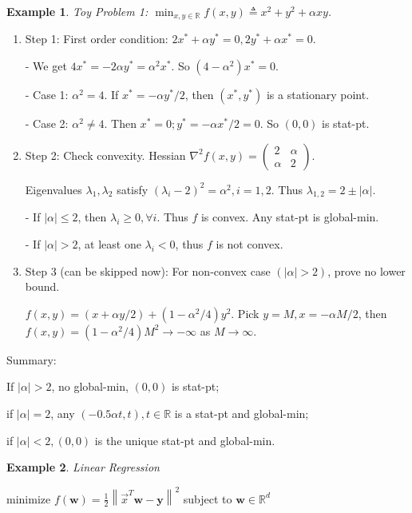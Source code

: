 \documentclass[11pt,a4paper]{article}
\newtheorem{example}{Example}
\begin{document}
\begin{example}
    Toy Problem 1: $\min _{x, y \in \mathbb{R}} f(x, y) \triangleq x^{2}+y^{2}+\alpha x y$.
\end{example}
\begin{enumerate}
    \item Step 1: First order condition: $2 x^{*}+\alpha y^{*}=0,2 y^{*}+\alpha x^{*}=0$.
    
    - We get $4 x^{*}=-2 \alpha y^{*}=\alpha^{2} x^{*}$. So $\left(4-\alpha^{2}\right) x^{*}=0$.
    
    - Case 1: $\alpha^{2}=4$. If $x^{*}=-\alpha y^{*} / 2$, then $\left(x^{*}, y^{*}\right)$ is a stationary point.
    
    - Case 2: $\alpha^{2} \neq 4$. Then $x^{*}=0 ; y^{*}=-\alpha x^{*} / 2=0$. So $(0,0)$ is stat-pt.
    \item Step 2: Check convexity. Hessian $\nabla^{2} f(x, y)=\left(\begin{array}{ll}2 & \alpha \\ \alpha & 2\end{array}\right)$.
    
    Eigenvalues $\lambda_{1}, \lambda_{2}$ satisfy $\left(\lambda_{i}-2\right)^{2}=\alpha^{2}, i=1,2$.
    Thus $\lambda_{1,2}=2 \pm|\alpha|$.

    - If $|\alpha| \leq 2$, then $\lambda_{i} \geq 0, \forall i$. Thus $f$ is convex. Any stat-pt is global-min.

    - If $|\alpha|>2$, at least one $\lambda_{i}<0$, thus $f$ is not convex.
    \item Step 3 (can be skipped now): For non-convex case $(|\alpha|>2)$, prove no lower bound.
    
    $f(x, y)=(x+\alpha y / 2)+\left(1-\alpha^{2} / 4\right) y^{2}$. Pick $y=M, x=-\alpha M / 2$, then
    $f(x, y)=\left(1-\alpha^{2} / 4\right) M^{2} \rightarrow-\infty$ as $M \rightarrow \infty$.
\end{enumerate}

Summary:

If $|\alpha|>2$, no global-min, $(0,0)$ is stat-pt;

if $|\alpha|=2$, any $(-0.5 \alpha t, t), t \in \mathbb{R}$ is a stat-pt and global-min;

if $|\alpha|<2,(0,0)$ is the unique stat-pt and global-min.

\begin{example}
Linear Regression
\end{example}
$\text{minimize } f(\mathbf{w})=\frac{1}{2}\left\|\vec{x}^{T} \mathbf{w}-\mathbf{y}\right\|^{2}$ subject to $ \mathbf{w} \in \mathbb{R}^{d}$
\end{document}
